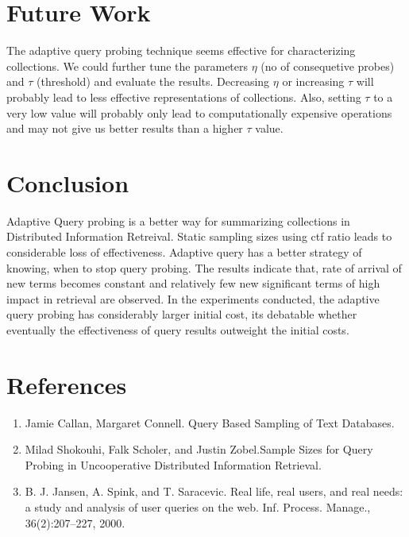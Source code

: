 \documentclass[paper=a4, fontsize=11pt,twoside]{scrartcl}	%
\begin{document}
\section{Future Work}
The adaptive query probing technique seems effective for characterizing collections. We could further tune the parameters $\eta$ (no of consequetive probes) and $\tau$ (threshold) and evaluate the results. Decreasing $\eta$ or increasing $\tau$ will probably lead to less effective representations of collections. Also, setting $\tau$ to a very low value will probably only lead to computationally expensive operations and may not give us better results than a higher $\tau$ value.


\section{Conclusion}
Adaptive Query probing is a better way for summarizing collections in Distributed Information Retreival. Static sampling sizes using ctf ratio leads to considerable loss of effectiveness. Adaptive query has a better strategy of knowing, when to stop query probing. The results indicate that, rate of arrival of new terms becomes constant and relatively few new significant terms of high impact in retrieval are observed. In the experiments conducted, the adaptive query probing has considerably larger initial cost, its debatable whether eventually the effectiveness of query results outweight the initial costs. 



\section{References}

\begin{enumerate}
  \item Jamie Callan, Margaret Connell. Query Based Sampling of Text Databases. 
  \item Milad Shokouhi, Falk Scholer, and Justin Zobel.Sample Sizes for Query Probing in Uncooperative Distributed Information Retrieval. 
  \item B. J. Jansen, A. Spink, and T. Saracevic. Real life, real users, and real needs: a study
and analysis of user queries on the web. Inf. Process. Manage., 36(2):207–227, 2000.
\end{enumerate}

\end{document}
